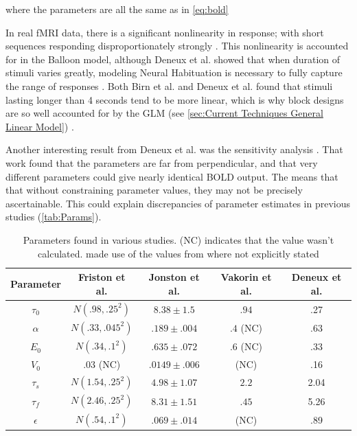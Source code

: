 where the parameters are all the same as in \autoref{eq:bold}

In real \ac{fMRI} data, there is a significant nonlinearity in response; with short sequences
responding disproportionately strongly \cite{Birn2001, Wager2005, Deneux2006}.
This nonlinearity is accounted for in the Balloon model, although Deneux et al.
showed that when duration of stimuli varies greatly,
modeling Neural Habituation is necessary to fully capture the range of responses \cite{Deneux2006}. 
Both Birn et al. and Deneux et al. found that 
stimuli lasting longer than 4 seconds 
tend to be more linear, which is why block designs are so well accounted for
by the \ac{GLM} (see \autoref{sec:Current Techniques General Linear Model})
\cite{Birn2001, Deneux2006}.

Another interesting result from Deneux et al. was the sensitivity analysis \cite{Deneux2006}.
That work found that the parameters are far from perpendicular,
and that very different parameters could give nearly identical \ac{BOLD} output.
The means that that without constraining parameter values, they may not be 
precisely ascertainable. This could explain discrepancies of parameter estimates
in previous studies (\autoref{tab:Params}).

\begin{table}[t]
\centering
\begin{tabular}{|c || c | c | c | c|}
\hline 
Parameter  & Friston et al. \cite{Friston2000} & Jonston et al. \cite{Johnston2007} 
    & Vakorin et al. \cite{Vakorin2007} & Deneux et al. \cite{Deneux2006}\\
\hline
$\tau_0  $ &  $N(.98 , .25^2)$  & $8.38 \pm 1.5  $ & $.94$ & .27\\
$\alpha  $ &  $N(.33 , .045^2)$  & $.189 \pm .004 $ & $.4$ (NC) & .63 \\
$E_0     $ &  $N(.34 , .1 ^2)$  & $.635 \pm .072 $ & $.6$ (NC) & .33\\
$V_0     $ &  $.03$ (NC)        & $.0149 \pm .006$ & (NC) & .16\\
$\tau_s  $ &  $N(1.54, .25^2)$  & $4.98 \pm 1.07 $ & $2.2$ & 2.04 \\
$\tau_f  $ &  $N(2.46, .25^2)$  & $8.31 \pm 1.51 $ & $.45$ & 5.26\\
$\epsilon$ &  $N(.54 , .1 ^2)$  & $.069 \pm .014 $ & (NC) & .89\\
\hline
\end{tabular}
\caption[Parameters found in various studies.]{Parameters found in various studies. (NC) indicates that the value
wasn't calculated. \cite{Vakorin2007} made use of the values from \cite{Friston2000}
where not explicitly stated}
\label{tab:Params} 
\end{table}

